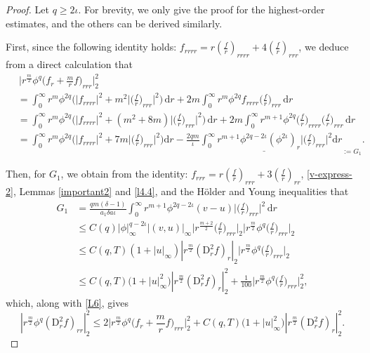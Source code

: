 \documentclass[11pt,reqno]{amsart}
\numberwithin{rk}{section}
\numberwithin{prop}{section}
\numberwithin{mydef}{section}
\numberwithin{lem}{section}
\numberwithin{equation}{section}
\numberwithin{thm}{section}
\begin{document}
\begin{proof}
Let $q\geq 2\iota$.  For brevity, we only give the proof for the highest-order estimates, and the others can be derived similarly.

First, since the following identity holds: $f_{rrrr}=r(\frac{f}{r})_{rrrr}+ 4 (\frac{f}{r})_{rrr}$, we deduce from a direct calculation that
\begin{equation}\label{L6}
\begin{aligned}
&\,\Big|r^\frac{m}{2}\phi^q \big(f_r+ \frac{m}{r}f\big)_{rrr}\Big|_2^2\\
&=\int_0^\infty r^m\phi^{2q} \Big(|f_{rrrr}|^2 +m^2 \Big|\big(\frac{f}{r}\big)_{rrr}\Big|^2\Big) \,\mathrm{d}r+ 2m\int_0^\infty r^m\phi^{2q} f_{rrrr} \big(\frac{f}{r}\big)_{rrr}\,\mathrm{d}r\\
&=\int_0^\infty  r^m\phi^{2q} \Big(|f_{rrrr}|^2 +(m^2+8m) \Big|\big(\frac{f}{r}\big)_{rrr}\Big|^2\Big) \,\mathrm{d}r +2m\int_0^\infty r^{m+1}\phi^{2q} \big(\frac{f}{r}\big)_{rrrr} \big(\frac{f}{r}\big)_{rrr}\,\mathrm{d}r\\
&=\int_0^\infty r^m\phi^{2q} \Big(|f_{rrrr}|^2\! +\!7m\Big|\big(\frac{f}{r}\big)_{rrr}\Big|^2\Big) \mathrm{d}r  -\underline{\frac{2qm}{\iota}\int_0^\infty\! r^{m+1}\phi^{2q-2\iota}(\phi^{2\iota})_r \Big|\big(\frac{f}{r}\big)_{rrr}\Big|^2 \mathrm{d}r}_{:=G_1}\!\!\!.    
\end{aligned}
\end{equation}


Then, for $G_1$, we obtain from the identity: $f_{rrr}=r(\frac{f}{r})_{rrr}+ 3 (\frac{f}{r})_{rr}$, \eqref{v-express-2}, Lemmas \ref{important2} and \ref{l4.4}, and the H\"older and Young inequalities that
\begin{equation}\label{G1}
\begin{aligned}
G_1&=\frac{qm(\delta-1)}{a_1\delta a\iota}\int_0^\infty r^{m+1}\phi^{2q-2\iota}(v-u)\Big|\big(\frac{f}{r}\big)_{rrr}\Big|^2 \,\mathrm{d}r\\
&\leq C(q)|\phi|_\infty^{q-2\iota}|(v,u)|_\infty \Big|r^\frac{m+2}{2} \big(\frac{f}{r}\big)_{rrr}\Big|_2\Big|r^\frac{m}{2}\phi^q \big(\frac{f}{r}\big)_{rrr}\Big|_2\\
&\leq C(q,T)(1+|u|_\infty) |r^\frac{m}{2} (\mathrm{D}_r^2 f)_r|_2\Big|r^\frac{m}{2}\phi^q \big(\frac{f}{r}\big)_{rrr}\Big|_2\\
&\leq C(q,T)\big(1+|u|_\infty^2\big)|r^\frac{m}{2} (\mathrm{D}_r^2 f)_r|_2^2+\frac{1}{100}\Big|r^\frac{m}{2}\phi^q \big(\frac{f}{r}\big)_{rrr}\Big|_2^2,
\end{aligned}
\end{equation}
which, along with \eqref{L6}, gives
\begin{equation}\label{L6'}
|r^\frac{m}{2}\phi^q(\mathrm{D}_r^2 f)_{rr}|_2^2 \leq 2\Big|r^\frac{m}{2}\phi^q \big(f_r+ \frac{m}{r}f\big)_{rrr}\Big|_2^2 +C(q,T)\big(1+|u|_\infty^2\big) |r^\frac{m}{2}(\mathrm{D}_r^2 f)_{r}|_2^2.  
\end{equation}
 


\end{proof}
\end{document}

